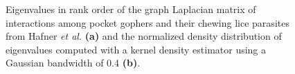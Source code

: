 
\begin{figure}
    \centering
    \caption{Eigenvalues in rank order of the graph Laplacian matrix of interactions among pocket gophers and their chewing lice parasites from Hafner {\em et al.} \cite{hafner1994disparate} \textbf{(a)} and the normalized density distribution of eigenvalues computed with a kernel density estimator using a Gaussian bandwidth of 0.4 \textbf{(b)}. }
    \label{fig:FP_eigendensity}
\end{figure}